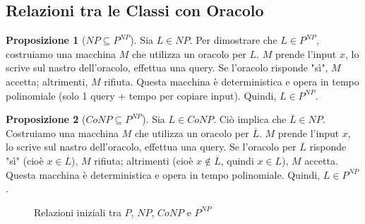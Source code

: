 \documentclass[a4paper]{article}
\theoremstyle{definition} %
\newtheorem{proposition}{Proposizione}
\begin{document}
\subsection{Relazioni tra le Classi con Oracolo}
\begin{proposition}[$NP \subseteq P^{NP}$]
Sia $L \in NP$. Per dimostrare che $L \in P^{NP}$, costruiamo una macchina $M$ che utilizza un oracolo per $L$. $M$ prende l'input $x$, lo scrive sul nastro dell'oracolo, effettua una query. Se l'oracolo risponde "sì", $M$ accetta; altrimenti, $M$ rifiuta. Questa macchina è deterministica e opera in tempo polinomiale (solo 1 query + tempo per copiare input). Quindi, $L \in P^{NP}$.
\end{proposition}

\begin{proposition}[$CoNP \subseteq P^{NP}$]
Sia $L \in CoNP$. Ciò implica che $\overline{L} \in NP$. Costruiamo una macchina $M$ che utilizza un oracolo per $\overline{L}$. $M$ prende l'input $x$, lo scrive sul nastro dell'oracolo, effettua una query. Se l'oracolo per $\overline{L}$ risponde "sì" (cioè $x \in \overline{L}$), $M$ rifiuta; altrimenti (cioè $x \notin \overline{L}$, quindi $x \in L$), $M$ accetta. Questa macchina è deterministica e opera in tempo polinomiale. Quindi, $L \in P^{NP}$.
\end{proposition}

\begin{figure}[h]
    \centering
    \caption{Relazioni iniziali tra $P$, $NP$, $CoNP$ e $P^{NP}$}
\end{figure}
\end{document}

